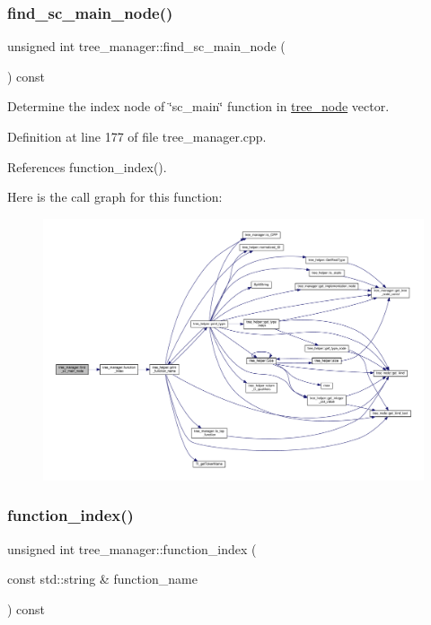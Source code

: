 \subsubsection{\texorpdfstring{find\+\_\+sc\+\_\+main\+\_\+node()}{find\_sc\_main\_node()}}
{\footnotesize\ttfamily unsigned int tree\+\_\+manager\+::find\+\_\+sc\+\_\+main\+\_\+node (\begin{DoxyParamCaption}{ }\end{DoxyParamCaption}) const}



Determine the index node of \char`\"{}sc\+\_\+main\char`\"{} function in \hyperlink{classtree__node}{tree\+\_\+node} vector. 



Definition at line 177 of file tree\+\_\+manager.\+cpp.



References function\+\_\+index().

Here is the call graph for this function\+:
\nopagebreak
\begin{figure}[H]
\begin{center}
\leavevmode
\includegraphics[width=350pt]{d2/ddd/classtree__manager_a2bf93600d8a99ad30880216fa12c929f_cgraph}
\end{center}
\end{figure}
\mbox{\label{classtree__manager_aada163f9f7e3d56944cb7b4d73329609}} 
\subsubsection{\texorpdfstring{function\+\_\+index()}{function\_index()}}
{\footnotesize\ttfamily unsigned int tree\+\_\+manager\+::function\+\_\+index (\begin{DoxyParamCaption}\item[{const std\+::string \&}]{function\+\_\+name }\end{DoxyParamCaption}) const}



